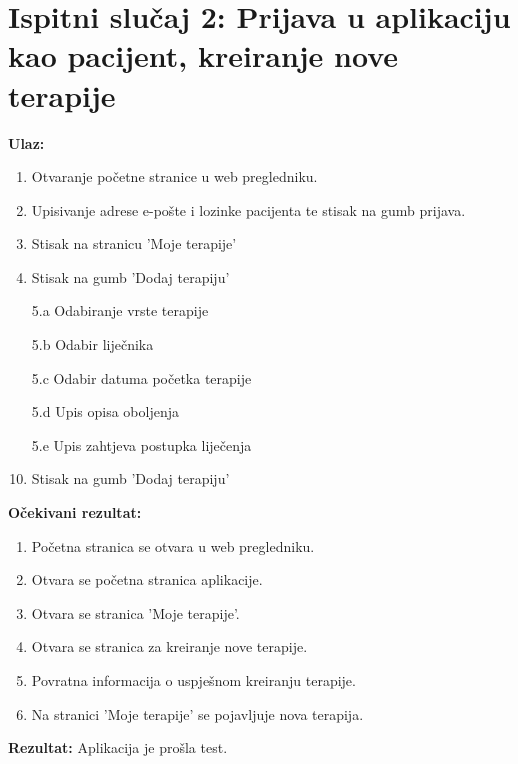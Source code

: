 \section*{Ispitni slučaj 2: Prijava u aplikaciju kao pacijent, kreiranje nove terapije}
\textbf{Ulaz:}
\begin{enumerate}[label=\arabic*.]
    \item Otvaranje početne stranice u web pregledniku.
    \item Upisivanje adrese e-pošte i lozinke pacijenta te stisak na gumb prijava.
    \item Stisak na stranicu 'Moje terapije'
    \item Stisak na gumb 'Dodaj terapiju'
    \item[5.a] Odabiranje vrste terapije
    \item[5.b] Odabir liječnika
    \item[5.c] Odabir datuma početka terapije
    \item[5.d] Upis opisa oboljenja
    \item[5.e] Upis zahtjeva postupka liječenja
    \item Stisak na gumb 'Dodaj terapiju'
\end{enumerate}
\textbf{Očekivani rezultat:}
\begin{enumerate}[label=\arabic*.]
    \item Početna stranica se otvara u web pregledniku.
    \item Otvara se početna stranica aplikacije.
    \item Otvara se stranica 'Moje terapije'.
    \item Otvara se stranica za kreiranje nove terapije.
    \item Povratna informacija o uspješnom kreiranju terapije.
    \item Na stranici 'Moje terapije' se pojavljuje nova terapija.
\end{enumerate}
\textbf{Rezultat:} Aplikacija je prošla test.

